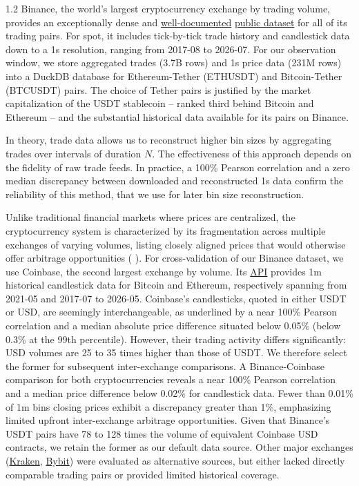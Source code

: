 \documentclass[10pt]{article}
\begin{document}
\begin{setstretch}{1.2}
Binance, the world's largest cryptocurrency exchange by trading volume, provides an exceptionally dense and \href{https://github.com/binance/binance-public-data}{well-documented} \href{https://data.binance.vision}{public dataset} for all of its trading pairs. For spot, it includes tick-by-tick trade history and candlestick data down to a 1s resolution, ranging from 2017-08 to 2026-07. For our observation window, we store aggregated trades (3.7B rows) and 1s price data (231M rows) into a DuckDB database for Ethereum-Tether (ETHUSDT) and Bitcoin-Tether (BTCUSDT) pairs. The choice of Tether pairs is justified by the market capitalization of the USDT stablecoin -- ranked third behind Bitcoin and Ethereum -- and the substantial historical data available for its pairs on Binance. 

In theory, trade data allows us to reconstruct higher bin sizes by aggregating trades over intervals of duration $N$. The effectiveness of this approach depends on the fidelity of raw trade feeds. In practice, a 100\% Pearson correlation and a zero median discrepancy between downloaded and reconstructed 1s data confirm the reliability of this method, that we use for later bin size reconstruction. 

Unlike traditional financial markets where prices are centralized, the cryptocurrency system is characterized by its fragmentation across multiple exchanges of varying volumes, listing closely aligned prices that would otherwise offer arbitrage opportunities (\cite{Makarov2020} \cite{Crepelliere2023}). For cross-validation of our Binance dataset, we use Coinbase, the second largest exchange by volume. Its \href{https://docs.cdp.coinbase.com/api-reference/advanced-trade-api/rest-api/public/get-public-product-candles}{API} provides 1m historical candlestick data for Bitcoin and Ethereum, respectively spanning from 2021-05 and 2017-07 to 2026-05. Coinbase's candlesticks, quoted in either USDT or USD, are seemingly interchangeable, as underlined by a near 100\% Pearson correlation and a median absolute price difference situated below 0.05\% (below 0.3\% at the 99th percentile). However, their trading activity differs significantly: USD volumes are 25 to 35 times higher than those of USDT. We therefore select the former for subsequent inter-exchange comparisons. A Binance-Coinbase comparison for both cryptocurrencies reveals a near 100\% Pearson correlation and a median price difference below 0.02\% for candlestick data. Fewer than 0.01\% of 1m bins closing prices exhibit a discrepancy greater than 1\%, emphasizing limited upfront inter-exchange arbitrage opportunities. Given that Binance's USDT pairs have 78 to 128 times the volume of equivalent Coinbase USD contracts, we retain the former as our default data source. Other major exchanges (\href{https://support.kraken.com/articles/360047543791-downloadable-historical-market-data-time-and-sales-}{Kraken}, \href{https://public.bybit.com}{Bybit}) were evaluated as alternative sources, but either lacked directly comparable trading pairs or provided limited historical coverage. 



\end{setstretch}
\end{document}
